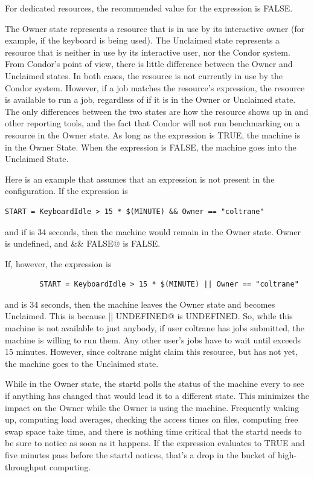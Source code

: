 For dedicated resources, the recommended value for the 
expression is FALSE.

The Owner state represents a resource that is in use by its
interactive owner (for example, if the keyboard is being used).
The Unclaimed state represents a resource that is neither in use by
its interactive user, nor the Condor system.
From Condor's point of view, there is little difference between the
Owner and Unclaimed states.
In both cases, the resource is not currently in use by the Condor
system.
However, if a job matches the resource's  expression, the
resource is available to run a job, regardless of if it is in the
Owner or Unclaimed state.
The only differences between the two states are how the resource shows
up in  and other reporting tools, and the fact that
Condor will not run benchmarking on a resource in the Owner state.
As long as the  expression is TRUE, the machine is
in the Owner State.
When the  expression is FALSE, the machine goes into
the Unclaimed State.

Here is an example that assumes that an 
expression is not present in the configuration.
If the  expression is
\begin{verbatim}
START = KeyboardIdle > 15 * $(MINUTE) && Owner == "coltrane" 
\end{verbatim}
and if  is 34 seconds,
then the machine would remain in the Owner state.
Owner is undefined, and
\verb@anything && FALSE@ is FALSE.

If, however, the  expression is
\begin{verbatim}
        START = KeyboardIdle > 15 * $(MINUTE) || Owner == "coltrane"
\end{verbatim}
and  is 34 seconds, then the machine
leaves the Owner state and becomes Unclaimed.
This is because
\verb@FALSE || UNDEFINED@ is UNDEFINED.
So, while this machine is not available to just anybody,
if user coltrane has jobs submitted, the machine is willing to run them.
Any other user's jobs have to wait
until  exceeds 15 minutes.
However, since coltrane might claim this resource,
but has not yet, the machine goes to the Unclaimed state.

While in the Owner state, the startd polls the status of the
machine every  to see if anything has changed
that would lead it to a different state.
This minimizes the impact on the Owner
while the Owner is using the machine.
Frequently waking up, computing load averages, checking the access
times on files, computing free swap space take time,
and there is nothing
time critical that the startd needs to be sure to notice as soon as it
happens.
If the  expression evaluates to TRUE and five
minutes pass before the startd notices,
that's a drop in the bucket of high-throughput computing.

